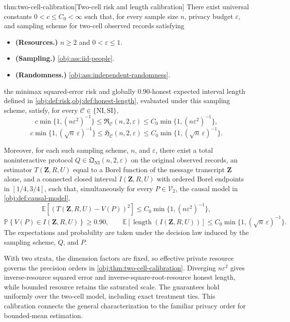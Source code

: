 \begin{theoremv}{thm:two-cell-calibration}[Two-cell risk and length calibration]
There exist universal constants \(0<c\le C_0<\infty\) such that, for every sample size \(n\), privacy budget \(\varepsilon\), and sampling scheme for two-cell observed records satisfying
\begin{itemize}
\item \textbf{(Resources.)} \(n\ge2\) and \(0<\varepsilon\le1\).
\item \textbf{(Sampling.)} \cref{obj:ass:iid-people}.
\item \textbf{(Randomness.)} \cref{obj:ass:independent-randomness}.
\end{itemize}
the minimax squared-error risk and globally \(0.90\)-honest expected interval length defined in \cref{obj:def:risk,obj:def:honest-length}, evaluated under this sampling scheme, satisfy, for every \(\mathcal C\in\{\mathrm{NI},\mathrm{SI}\}\),
\[
c\min\{1,(n\varepsilon^2)^{-1}\}
\le \mathfrak R_{\mathcal C}(n,2,\varepsilon)
\le C_0\min\{1,(n\varepsilon^2)^{-1}\},
\]
\[
c\min\{1,(\sqrt n\,\varepsilon)^{-1}\}
\le \mathfrak H_{\mathcal C}(n,2,\varepsilon)
\le C_0\min\{1,(\sqrt n\,\varepsilon)^{-1}\}.
\]

Moreover, for each such sampling scheme, \(n\), and \(\varepsilon\), there exist a total noninteractive protocol \(Q\in\mathfrak Q_{\mathrm{NI}}(n,2,\varepsilon)\) on the original observed records, an estimator \(T(\mathbf Z,R,U)\) equal to a Borel function of the message transcript \(\mathbf Z\) alone, and a connected closed interval \(I(\mathbf Z,R,U)\) with ordered Borel endpoints in \([1/4,3/4]\), such that, simultaneously for every \(P\in\mathcal V_2\), the causal model in \cref{obj:def:causal-model},
\[
\mathbb E\!\left[(T(\mathbf Z,R,U)-V(P))^2\right]
\le C_0\min\{1,(n\varepsilon^2)^{-1}\},
\]
\[
\mathbb P\!\left\{V(P)\in I(\mathbf Z,R,U)\right\}\ge0.90,
\qquad
\mathbb E\!\left[\operatorname{length}(I(\mathbf Z,R,U))\right]
\le C_0\min\{1,(\sqrt n\,\varepsilon)^{-1}\}.
\]
The expectations and probability are taken under the decision law induced by the sampling scheme, \(Q\), and \(P\).
\end{theoremv}

With two strata, the dimension factors are fixed, so effective private resource governs the precision orders in \cref{obj:thm:two-cell-calibration}. Diverging \(n\varepsilon^2\) gives inverse-resource squared error and inverse-square-root-resource honest length, while bounded resource retains the saturated scale. The guarantees hold uniformly over the two-cell model, including exact treatment ties. This calibration connects the general characterization to the familiar privacy order for bounded-mean estimation.

